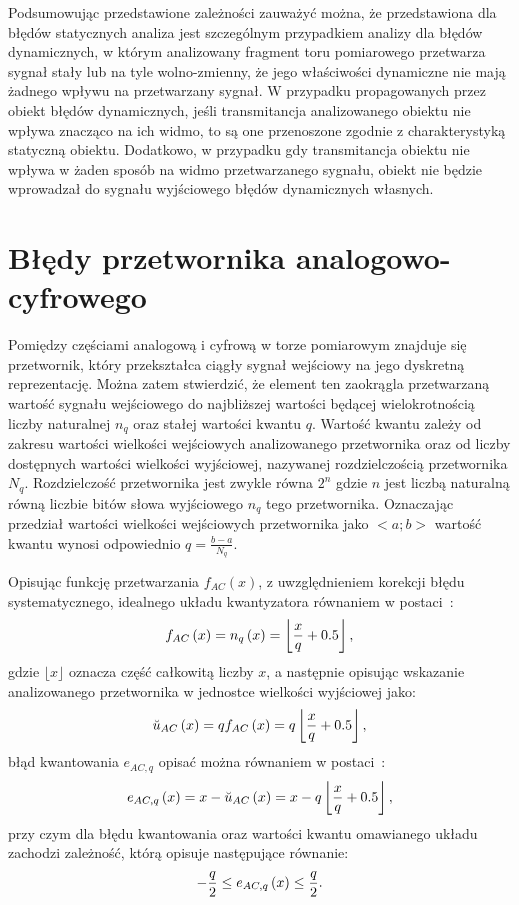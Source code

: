 Podsumowując przedstawione zależności zauważyć można, że przedstawiona dla błędów statycznych analiza jest szczególnym przypadkiem analizy dla błędów dynamicznych, w którym analizowany fragment toru pomiarowego przetwarza sygnał stały lub na tyle wolno-zmienny, że jego właściwości dynamiczne nie mają żadnego wpływu na przetwarzany sygnał. W przypadku propagowanych przez obiekt błędów dynamicznych, jeśli transmitancja analizowanego obiektu nie wpływa znacząco na ich widmo, to są one przenoszone zgodnie z charakterystyką statyczną obiektu. Dodatkowo, w przypadku gdy transmitancja obiektu nie wpływa w żaden sposób na widmo przetwarzanego sygnału, obiekt nie będzie wprowadzał do sygnału wyjściowego błędów dynamicznych własnych.

\section{Błędy przetwornika analogowo-cyfrowego}

Pomiędzy częściami analogową i cyfrową w torze pomiarowym znajduje się przetwornik, który przekształca ciągły sygnał wejściowy na jego dyskretną reprezentację. Można zatem stwierdzić, że element ten zaokrągla przetwarzaną wartość sygnału wejściowego do najbliższej wartości będącej wielokrotnością liczby naturalnej $n_{q}$ oraz stałej wartości kwantu $q$. Wartość kwantu zależy od zakresu wartości wielkości wejściowych analizowanego przetwornika oraz od liczby dostępnych wartości wielkości wyjściowej, nazywanej rozdzielczością przetwornika $N_{q}$. Rozdzielczość przetwornika jest zwykle równa $2^{n}$ gdzie $n$ jest liczbą naturalną równą liczbie bitów słowa wyjściowego $n_{q}$ tego przetwornika. Oznaczając przedział wartości wielkości wejściowych przetwornika jako $<a;b>$ wartość kwantu wynosi odpowiednio $q = \frac{b - a}{N_{q}}$.

Opisując funkcję przetwarzania $f_{AC}(x)$, z uwzględnieniem korekcji błędu systematycznego, idealnego układu kwantyzatora równaniem w postaci~\cite{jakubiec_system}:
\begin{equation}
f_{AC} \left(x\right) = n_{q} \left(x\right) = \left\lfloor \frac{x}{q} + 0.5 \right\rfloor \label{eq:adc_function},
\end{equation}
gdzie $\lfloor x \rfloor$ oznacza część całkowitą liczby $x$, a następnie opisując wskazanie analizowanego przetwornika w jednostce wielkości wyjściowej jako:
\begin{equation}
\breve{u}_{AC} \left(x\right) = q f_{AC} \left(x\right) = q \left\lfloor \frac{x}{q} + 0.5 \right\rfloor \label{eq:adc_output},
\end{equation}
błąd kwantowania $e_{AC,q}$ opisać można równaniem w postaci~\cite{jakubiec_system}:
\begin{equation}
e_{AC,q} \left(x\right) = x - \breve{u}_{AC} \left(x\right) = x - q \left\lfloor \frac{x}{q} + 0.5 \right\rfloor \label{eq:adc_qerror},
\end{equation}
przy czym dla błędu kwantowania oraz wartości kwantu omawianego układu zachodzi zależność, którą opisuje następujące równanie:
\begin{equation}
-\frac{q}{2} \le e_{AC,q} \left(x\right) \le \frac{q}{2} \label{eq:adc_qerrrange}.
\end{equation}

